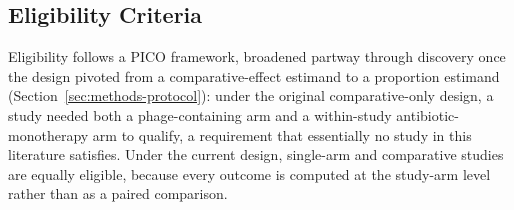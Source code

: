 \subsection{Eligibility Criteria}
\label{sec:methods-eligibility}

Eligibility follows a PICO framework, broadened partway through discovery once the design pivoted from a comparative-effect estimand to a proportion estimand (Section~\ref{sec:methods-protocol}): under the original comparative-only design, a study needed both a phage-containing arm and a within-study antibiotic-monotherapy arm to qualify, a requirement that essentially no study in this literature satisfies. Under the current design, single-arm and comparative studies are equally eligible, because every outcome is computed at the study-arm level rather than as a paired comparison.

